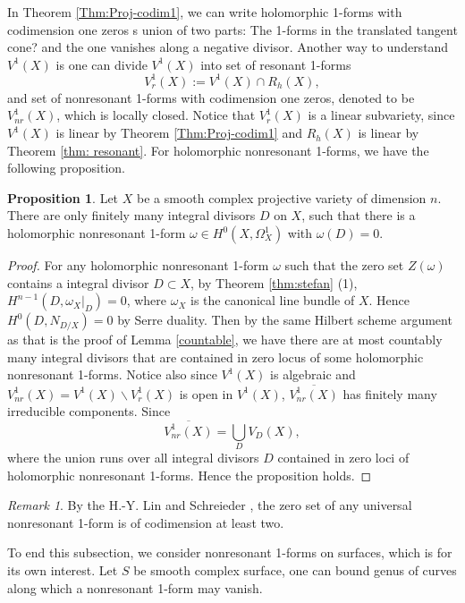 \documentclass[a4paper,12pt,reqno]{amsart}
\theoremstyle{plain}
\theoremstyle{definition}
\newtheorem{proposition}[theorem]{Proposition}
\theoremstyle{remark}
\newtheorem{remark}[theorem]{Remark}
\begin{document}
 In Theorem \ref{Thm:Proj-codim1}, we can write holomorphic 1-forms with codimension one zeros s union of two parts: The 1-forms in the {\color{red} translated tangent cone?} and the one vanishes along a negative divisor.  Another way to understand  $V^1(X)$ is one can divide $V^1(X)$ into set of resonant 1-forms $$V^1_r(X):=V^1(X)\cap R_h(X),$$ and set of nonresonant 1-forms with codimension one zeros, denoted to be $V^1_{nr}(X)$, which is locally closed. Notice that $V_r^1(X)$ is a linear subvariety, since $V^1(X)$ is linear by Theorem \ref{Thm:Proj-codim1}  and $R_h(X)$ is linear by Theorem \ref{thm: resonant}. For holomorphic nonresonant 1-forms,  we have the following proposition.
 \begin{proposition}
Let $X$ be a smooth complex projective variety of dimension $n$. There are only finitely many integral divisors $D$ on $X$, such that there is a holomorphic nonresonant 1-form $\omega\in H^0(X, \Omega_X^1)$ with $\omega(D)=0$.
 \end{proposition}
 
 \begin{proof}
For any holomorphic nonresonant 1-form $\omega$ such that the zero set $Z(\omega)$ contains a integral divisor $D\subset X$, by Theorem \ref{thm:stefan} (1), $H^{n-1}(D, {\omega_X}|_D)=0$, where $\omega_X$ is the canonical line bundle of $X$. Hence $H^0(D, N_{D/X})=0$ by Serre duality. Then by the same Hilbert scheme argument as that is the proof of   Lemma \ref{countable}, we have there are at most countably many integral divisors that are contained in zero locus of some holomorphic nonresonant 1-forms.  Notice also since $V^1(X)$ is algebraic and $V^1_{nr}(X)=V^1(X)\backslash V_r^1(X)$ is open in $V^1(X)$, $\overline{V_{nr}^1(X)}$ has finitely many irreducible components. Since $$\overline{V_{nr}^1(X)}=\bigcup_{D}V_D(X),$$ where the union runs over all integral divisors $D$ contained in zero loci of holomorphic nonresonant 1-forms. Hence the proposition holds.
 \end{proof}
 
 \begin{remark}
By the H.-Y. Lin and Schreieder \cite[appendix]{SS19}, the zero set of any universal nonresonant 1-form is of codimension at least two. 
 \end{remark}

 To end this subsection, we consider nonresonant 1-forms on surfaces, which is for its own interest. Let $S$ be smooth complex surface, one can bound genus of curves along which a nonresonant 1-form may vanish.
 
\end{document}
